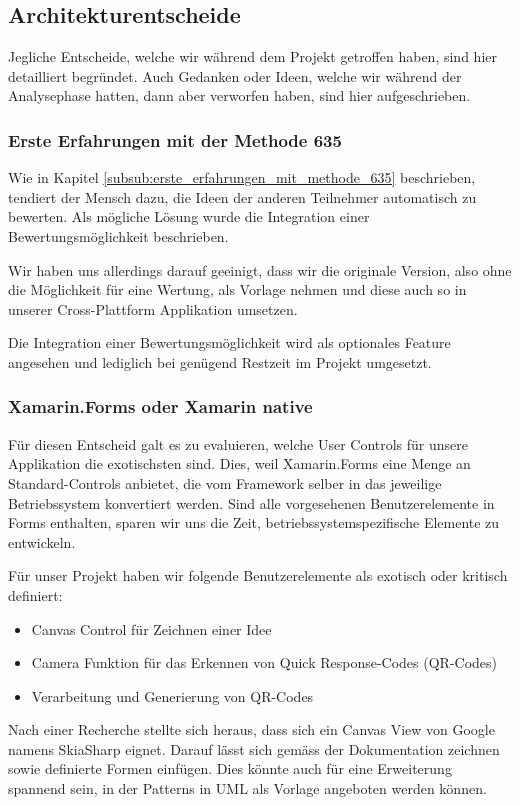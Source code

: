 \subsection{Architekturentscheide}
Jegliche Entscheide, welche wir während dem Projekt getroffen haben, sind hier detailliert begründet. Auch Gedanken oder Ideen, welche wir während der Analysephase hatten, dann aber verworfen haben, sind hier aufgeschrieben.

\subsubsection{Erste Erfahrungen mit der Methode 635}
Wie in Kapitel \ref{subsub:erste_erfahrungen_mit_methode_635} beschrieben, tendiert der Mensch dazu, die Ideen der anderen Teilnehmer automatisch zu bewerten. Als mögliche Lösung wurde die Integration einer Bewertungsmöglichkeit beschrieben.


Wir haben uns allerdings darauf geeinigt, dass wir die originale Version, also ohne die Möglichkeit für eine Wertung, als Vorlage nehmen und diese auch so in unserer Cross-Plattform Applikation umsetzen. 


Die Integration einer Bewertungsmöglichkeit wird als optionales Feature angesehen und lediglich bei genügend Restzeit im Projekt umgesetzt.

\subsubsection{Xamarin.Forms oder Xamarin native}
Für diesen Entscheid galt es zu evaluieren, welche User Controls für unsere Applikation die exotischsten sind. Dies, weil Xamarin.Forms eine Menge an Standard-Controls anbietet, die vom Framework selber in das jeweilige Betriebssystem konvertiert werden. Sind alle vorgesehenen Benutzerelemente in Forms enthalten, sparen wir uns die Zeit, betriebssystemspezifische Elemente zu entwickeln. 

Für unser Projekt haben wir folgende Benutzerelemente als exotisch oder kritisch definiert:
\begin{itemize}
	\item Canvas Control für Zeichnen einer Idee
	\item Camera Funktion für das Erkennen von Quick Response-Codes (QR-Codes)
	\item Verarbeitung und Generierung von QR-Codes
\end{itemize}

Nach einer Recherche stellte sich heraus, dass sich ein Canvas View von Google namens SkiaSharp \cite{skiaSharp} eignet. Darauf lässt sich gemäss der Dokumentation zeichnen sowie definierte Formen einfügen. Dies könnte auch für eine Erweiterung spannend sein, in der Patterns in UML als Vorlage angeboten werden können.

